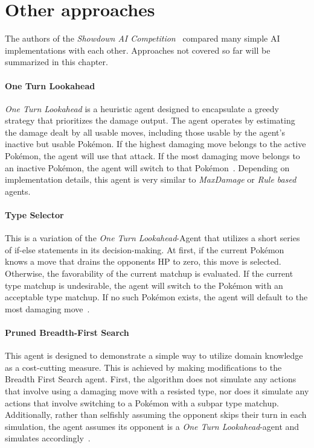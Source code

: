 \section{Other approaches}
The authors of the \textit{Showdown AI Competition}~\autocite{Lee_Togelius_2017} compared many
simple AI implementations with each other. Approaches not covered so far will be summarized
in this chapter.


\paragraph{One Turn Lookahead}
\emph{One Turn Lookahead} is a heuristic agent designed to encapsulate a greedy strategy that 
prioritizes the damage output. The agent operates by estimating the damage dealt by all usable moves, 
including those usable by the agent's inactive but usable Pokémon. If the highest damaging move 
belongs to the active Pokémon, the agent will use that attack. If the most damaging move belongs to 
an inactive Pokémon, the agent will switch to that Pokémon~\autocite{Lee_Togelius_2017}. Depending 
on implementation details, this agent is very similar to \emph{MaxDamage} or \emph{Rule based}
agents.

\paragraph{Type Selector}
This is a variation of the \textit{One Turn Lookahead}-Agent that utilizes a short series of
if-else statements in its decision-making. At first, if the current Pokémon knows a move 
that drains the opponents \ac{HP} to zero, this move is selected. Otherwise, the 
favorability of the current matchup is evaluated. If the current type matchup is 
undesirable, the agent will switch to the Pokémon with an acceptable type matchup. If no
such Pokémon exists, the agent will default to the most damaging move~\autocite{Lee_Togelius_2017}.

\paragraph{Pruned Breadth-First Search}
This agent is designed to demonstrate a simple way to utilize domain knowledge as a cost-cutting 
measure. This is achieved by making modifications to the Breadth First Search agent. First, 
the algorithm does not simulate any actions that involve using a damaging move with a resisted type, 
nor does it simulate any actions that involve switching to a Pokémon with a subpar type matchup. 
Additionally, rather than selfishly assuming the opponent skips their turn in each simulation, the 
agent assumes its opponent is a \emph{One Turn Lookahead}-agent and simulates 
accordingly~\autocite{Lee_Togelius_2017}.

